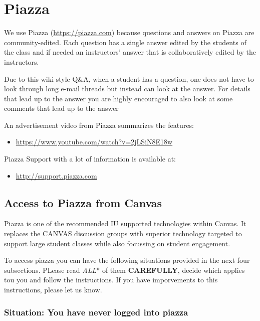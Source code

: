 \section{Piazza}\label{piazza}

We use Piazza (\url{https://piazza.com}) because questions and answers
on Piazza are community-edited. Each question has a single answer edited
by the students of the class and if needed an instructors' answer that
is collaboratively edited by the instructors.

Due to this wiki-style Q\&A, when a student has a question, one does not
have to look through long e-mail threads but instead can look at the
answer. For details that lead up to the answer you are highly encouraged
to also look at some comments that lead up to the answer

An advertisement video from Piazza summarizes the features:

\begin{itemize}
\tightlist
\item
  \url{https://www.youtube.com/watch?v=2jLSiN8E18w}
\end{itemize}

Piazza Support with a lot of information is available at:

\begin{itemize}
\tightlist
\item
  \url{http://support.piazza.com}
\end{itemize}

\subsection{Access to Piazza from
Canvas}\label{access-to-piazza-from-canvas}

Piazza is one of the recommended IU supported technologies within
Canvas. It replaces the CANVAS discussion groups with superior
technology targeted to support large student classes while also
focussing on student engagement.

To access piazza you can have the following situations provided in the
next four subsections. PLease read \emph{ALL}* of them
\textbf{CAREFULLY}, decide which applies tou you and follow the
instructions. If you have imporvements to this instructions, please let
us know.

\subsubsection{Situation: You have never logged into
piazza}\label{situation-you-have-never-logged-into-piazza}

